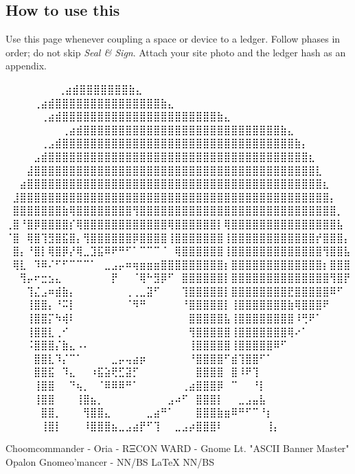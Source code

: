 \subsection*{How to use this}
Use this page whenever coupling a space or device to a ledger. Follow phases in order; do not skip \emph{Seal \& Sign}. Attach your site photo and the ledger hash as an appendix.
\iffalse

  ⠀⠀⠀⠀⠀             ⠀⠀⢀⣴⣾⣿⣿⣿⣿⣿⣿⣿⣷⣄⠀⠀⠀⠀⠀⠀⠀⠀
⠀⠀⠀  ⠀      ⠀⠀⠀⠀⢀⣴⣾⣿⣿⣿⣿⣿⣿⣿⣿⣿⣿⣿⣿⣿⣿⣿⣷⣄⠀⠀⠀⠀⠀⠀⠀⠀
⠀⠀ ⠀   ⠀⠀⠀⠀⠀⢀⣴⣾⣿⣿⣿⣿⣿⣿⣿⣿⣿⣿⣿⣿⣿⣿⣿⣿⣿⣿⣿⣿⣿⣿⣷⣄⠀⠀⠀⠀⠀⠀⠀⠀
⠀⠀⠀⠀⠀⠀⠀⠀⢀⣴⣾⣿⣿⣿⣿⣿⣿⣿⣿⣿⣿⣿⣿⣿⣿⣿⣿⣿⣿⣿⣿⣿⣿⣿⣿⣿⣿⣿⣿⣷⣄⠀⠀⠀⠀⠀⠀⠀⠀
⠀⠀⠀⠀⠀⢀⣠⣾⣿⣿⣿⣿⣿⣿⣿⣿⣿⣿⣿⣿⣿⣿⣿⣿⣿⣿⣿⣿⣿⣿⣿⣿⣿⣿⣿⣿⣿⣿⣿⣿⣿⣷⡄⠀⠀⠀⠀⠀⠀
⠀⠀⠀⠀⣠⣾⣿⣿⣿⣿⣿⣿⣿⣿⣿⣿⣿⣿⣿⣿⣿⣿⣿⣿⣿⣿⣿⣿⣿⣿⣿⣿⣿⣿⣿⣿⣿⣿⣿⣿⣿⣿⣿⣆⠀⠀⠀⠀⠀
⠀⠀⠀⣼⣿⣿⣿⣿⣿⣿⣿⣿⣿⣿⣿⣿⣿⣿⣿⣿⣿⣿⣿⣿⣿⣿⣿⣿⣿⣿⣿⣿⣿⣿⣿⣿⣿⣿⣿⣿⣿⣿⣿⣿⣇⠀⠀⠀⠀
⠀⠀⣴⣿⣿⣿⣿⣿⣿⣿⣿⣿⣿⣿⣿⣿⣿⣿⣿⣿⣿⣿⣿⣿⣿⣿⣿⣿⣿⣿⣿⣿⣿⣿⣿⣿⣿⣿⣿⣿⣿⣿⣿⣿⣿⣆⠀⠀⠀
⠀⣸⣿⣿⣿⣿⣿⣿⣿⣿⣿⣿⣿⣿⣿⣿⣿⣿⣿⣿⣿⣿⣿⣿⣿⣿⣿⣿⣿⣿⣿⣿⣿⣿⣿⣿⣿⣿⣿⣿⣿⣿⣿⣿⣿⣿⡄⠀⠀
⠀⣿⣿⣿⣿⣿⣿⣿⣷⢿⣿⣿⣿⣿⣿⣿⣿⣿⢻⣿⣿⣿⣿⣿⣿⣿⣿⣿⣿⣿⣿⣿⣿⣿⣿⣿⣿⣿⣿⣿⣿⣿⣿⣿⣿⣿⣿⡀⠀
⢀⣿⠘⣿⡿⣿⣿⣿⣿⡎⢿⣿⣿⣿⣿⣿⣿⣿⣿⣿⣿⣿⣿⢿⣿⣿⣿⣿⣿⣿⡇⢿⣿⣿⣿⣿⣿⣿⣿⣿⣿⣿⣿⣿⣿⣿⣿⣧⠀
⠈⣿⠀⢿⣿⢹⣻⣿⣯⣿⡄⢻⣿⣿⣿⣿⣿⣿⡿⣿⣿⣿⣿⢸⣿⣿⣿⣿⣿⣿⣿⢸⣿⣿⣿⣿⣿⣿⣿⣿⣿⣿⣿⣿⡞⣿⣿⣿⡄
⠀⣿⡄⠘⣿⡇⢿⣿⡿⡜⢿⣀⣹⣯⠿⠟⠛⠋⠁⠉⠉⠉⠈⠀⢿⣿⣿⣿⣿⣿⣿⢸⣿⣿⣿⣿⣿⣿⣿⣿⣿⣿⣿⣿⣿⢻⣿⣿⣧
⠀⢿⣇⠀⠹⠿⠌⠋⠋⠉⠉⠉⠁⠀⣀⣠⡤⠶⢶⣶⣶⣶⣿⣿⣿⣿⣿⣿⣿⣿⣿⡆⣿⣿⣿⣿⣿⣿⣿⣿⣿⣿⣿⣿⣿⡆⣿⣿⣿
⠀⠀⢻⡤⠖⣒⣢⣄⠀⠀⠀⠀⠀⠀⠀⡟⠀⠀⠈⢿⠓⣻⡿⠋⠀⣿⣿⣿⣿⣿⣿⡇⣿⣿⣿⣿⣿⣿⣿⣿⣿⣿⣿⣿⣿⣿⢻⣿⡟
⠀⠀⠀⢹⣌⣠⠶⣾⣷⡄⠀⠀⠀⠀⠀⠀⠀⢀⢀⣀⣽⠋⠀⠀⠀⢹⣿⣿⣿⣿⣿⡇⣿⣿⣿⣿⣿⣿⣿⣿⣟⣿⣿⣿⣿⣿⠿⠋⠀
⠀⠀⠀⢸⣿⣿⡄⠘⠭⡇⠀⠀⠀⠀⠀⠀⠀⠈⠻⠛⠀⠀⠀⠀⠀⠘⣿⣿⣿⣿⣿⡇⢸⣿⣿⣿⣿⣿⣿⣿⣷⢿⣿⣿⣿⠟⠀⠀⠀
⠀⠀⠀⢸⣿⣿⡍⠳⢾⠇⠀⠀⠀⠀⠀⠀⠀⠀⠀⠀⠀⠀⠀⠀⠀⠀⣿⣿⣿⣿⣿⣧⢸⣿⣿⣿⣿⣿⣿⣿⣿⠸⢛⠟⠁⠀⠀⠀⠀
⠀⠀⠀⢸⣿⣿⣇⢀⠊⠀⠀⠀⠀⠀⠀⠀⠀⠀⠀⠀⠀⠀⠀⠀⠀⠀⢻⣿⣿⣿⣿⣿⢸⣿⣿⣿⣿⣿⣿⣿⢿⠔⠁⠀⠀⠀⠀⠀⠀
⠀⠀⠀⠨⣿⣿⣿⡌⣷⣄⠠⠄⠀⠀⠀⠀⠀⠀⠀⠀⠀⠀⠀⠀⠀⠀⢸⣿⣿⣿⣿⣿⢸⣿⣿⣿⣿⣿⠿⠋⠀⠀⠀⠀⠀⠀⠀⠀⠀
⠀⠀⠀⠀⣿⣿⣇⠹⡌⠉⠁⠀⠀⠀⠀⣀⡤⢤⣴⡶⠀⠀⠀⠀⠀⠀⠘⣿⣿⣿⣿⠋⣾⢹⣿⣿⠋⠁⠀⠀⠀⠀⠀⠀⠀⠀⠀⠀⠀
⠀⠀⠀⠀⣿⣿⣯⠀⠹⣄⠀⠀⠰⣯⣵⢟⣋⣽⡋⠀⠀⠀⠀⠀⠀⠀⠀⣿⣿⣿⣿⠀⣿⠸⠟⢹⠀⠀⠀⠀⠀⠀⠀⠀⠀⠀⠀⠀⠀
⠀⠀⠀⠀⢸⣿⣿⠀⠀⠙⢦⡀⠀⠈⠿⠿⠿⠛⠁⠀⠀⠀⠀⠀⠀⢀⣴⣿⣿⣿⡿⠀⠉⠀⠀⠘⡇⠀⠀⠀⠀⠀⠀⠀⠀⠀⠀⠀⠀
⠀⠀⠀⠀⢸⣿⣿⠀⠀⠀⢸⣿⣦⡀⠀⠀⠀⠀⠀⠀⠀⠀⠀⣠⠴⠋⠀⣿⣿⣿⡇⠀⠀⣀⣠⣤⣧⠀⠀⠀⠀⠀⠀⠀⠀⠀⠀⠀⠀
⠀⠀⠀⠀⠀⣿⣿⡀⠀⠀⠀⢻⣿⣿⣄⠀⠀⠀⠀⠀⣀⣴⠛⠁⠀⠀⠀⣿⣿⣿⣷⣶⠿⠛⠋⠉⠘⡆⠀⠀⠀⠀⠀⠀⠀⠀⠀⠀⠀
⠀⠀⠀⠀⠀⢸⣿⡇⠀⠀⠀⠸⣿⣿⣿⣦⣀⣠⣴⡟⠋⢹⠀⠀⣀⣠⡴⣿⣿⣿⠇⠀⠀⠀⠀⠀⠀⢸⡄⠀⠀⠀⠀⠀⠀⠀⠀⠀⠀

Choomcommander - Oria - RΞCON WARD - Gnome Lt. "ASCII Banner Master"
             Opalon Gnomeo'mancer - NN/BS LaTeX{} NN/BS

